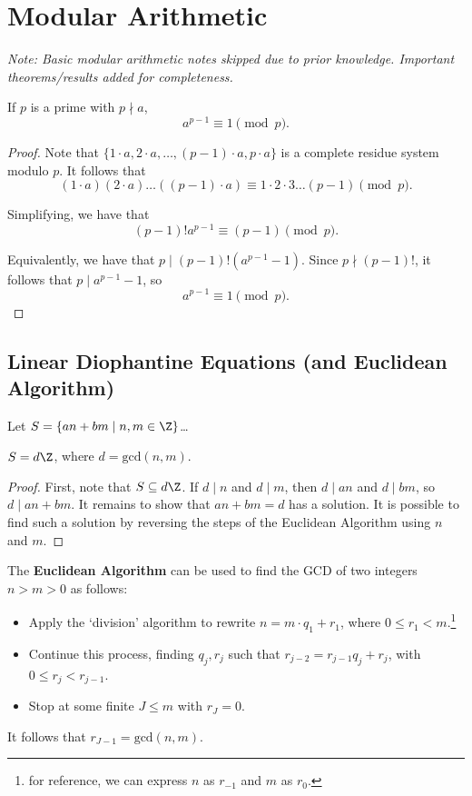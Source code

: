 \documentclass[11pt]{article}
\begin{document}
\newpage

\section{Modular Arithmetic}

\textit{Note: Basic modular arithmetic notes skipped due to prior knowledge. Important theorems/results added for completeness.}

\begin{theorem}
If $p$ is a prime with $p \nmid a$, 
\[
    a^{p-1} \equiv 1 \pmod p.
\]
\end{theorem}

\begin{proof}
Note that $\{ 1\cdot a, 2\cdot a, \dots, (p-1)\cdot a, p\cdot a\}$
is a complete residue system modulo $p$. It follows that
\[
    (1\cdot a)(2\cdot a) \dots ((p-1) \cdot a) \equiv 1\cdot 2\cdot 3 \dots (p-1) \pmod p.
\]

Simplifying, we have that
\[
    (p-1)! a^{p-1} \equiv (p-1) \pmod p.
\]

Equivalently, we have that $p \mid (p-1)! \left( a^{p-1} - 1 \right).$ Since $p \nmid (p-1)!$, it follows that $p \mid a^{p-1} - 1$, so
\[
    a^{p-1} \equiv 1 \pmod p.
\]
\end{proof}

\subsection{Linear Diophantine Equations (and Euclidean Algorithm)}
Let $S = \{  an + bm \mid n, m \in \Z \}$\dots
\begin{theorem}
$S = d\Z$, where $d = \mathrm{gcd}(n, m).$  
\end{theorem}

\begin{proof}
First, note that $S \subseteq d\Z$. If $d \mid n$ and $d \mid m$, then $d \mid an$ and $d \mid bm$, so $d \mid an + bm$. 
It remains to show that $an + bm = d$ has a solution. It is possible to find such a solution by reversing the steps of the Euclidean Algorithm using $n$ and $m$.
\end{proof}

\begin{theorem}
The \textbf{Euclidean Algorithm} can be used to find the GCD of two integers $n > m > 0$ as follows:
\begin{itemize}
    \item Apply the `division' algorithm to rewrite $n = m \cdot q_1 + r_1$, where $0 \leq r_1 < m$.\footnote{for reference, we can express $n$ as $r_{-1}$ and $m$ as $r_0$.}
    \item Continue this process, finding $q_j, r_j$ such that $r_{j-2} = r_{j-1} q_j + r_j$, with $0 \leq r_j < r_{j-1}$.
    \item Stop at some finite $J \leq m$ with $r_J = 0$.
\end{itemize}

It follows that $r_{J-1} = \mathrm{gcd}(n, m).$ 
\end{theorem}
\end{document}
